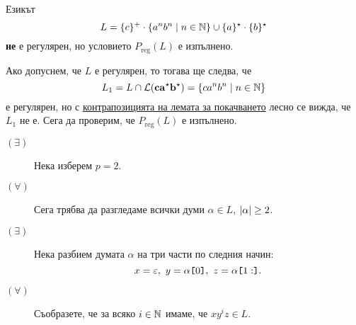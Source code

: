 \begin{example}
  Езикът
  \[L = \{c\}^+\cdot\{a^nb^n\mid n\in\mathbb{N}\}\cup \{a\}^\star \cdot \{b\}^\star\]
  {\bf не} е регулярен, но условието $P_{\text{reg}}(L)$ е изпълнено.
\end{example}
\begin{hint}
  Ако допуснем, че $L$ е регулярен, то тогава ще следва, че 
  \[L_1 = L\cap \mathcal{L}(\mathbf{ca^\star b^\star}) = \{ca^nb^n \mid n\in\mathbb{N}\}\]
  е регулярен, но с \hyperref[cor:pumping-reg]{контрапозицията на лемата за покачването} лесно се вижда, че $L_1$ не е. Сега да проверим, че $P_{\text{reg}}(L)$ е изпълнено. 
  \begin{description}
  \item[$(\exists)$]
    Нека изберем $p = 2$.
  \item[$(\forall)$]
    Сега трябва да разгледаме всички думи $\alpha \in L$, $\vert{\alpha}\vert \geq 2$.
  \item[$(\exists)$]
    Нека разбием думата $\alpha$ на три части по следния начин:
    \[x = \varepsilon,\ y = \alpha\texttt{[}{0}\texttt{]},\ z = \alpha\texttt{[}{1:}\texttt{]}.\]
  \item[$(\forall)$]
    Съобразете, че за всяко $i \in \mathbb{N}$ имаме, че $xy^iz \in L$.
  \end{description}
\end{hint}


